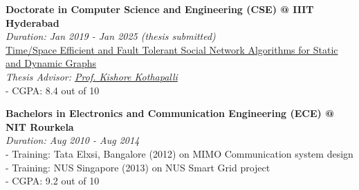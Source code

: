 \textbf{Doctorate in Computer Science and Engineering (CSE) @ IIIT Hyderabad} \\
\emph{Duration: Jan 2019 - Jan 2025 (thesis submitted)} \\
\href{https://puzzlef.github.io}{Time/Space Efficient and Fault Tolerant Social Network Algorithms for Static and Dynamic Graphs} \\
\emph{Thesis Advisor: \href{https://faculty.iiit.ac.in/~kkishore/}{Prof. Kishore Kothapalli}} \\
- CGPA: 8.4 out of 10

\noindent
\textbf{Bachelors in Electronics and Communication Engineering (ECE) @ NIT Rourkela} \\
\emph{Duration: Aug 2010 - Aug 2014} \\
- Training: Tata Elxsi, Bangalore (2012) on MIMO Communication system design \\
- Training: NUS Singapore (2013) on NUS Smart Grid project \\
- CGPA: 9.2 out of 10
